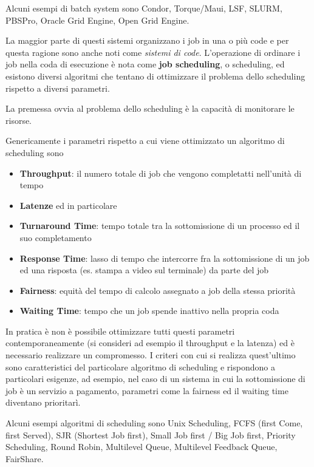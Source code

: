 \documentclass[italian,]{article}
\providecommand{\tightlist}{%
  \setlength{\itemsep}{0pt}\setlength{\parskip}{0pt}}
\begin{document}
Alcuni esempi di batch system sono Condor, Torque/Maui, LSF, SLURM,
PBSPro, Oracle Grid Engine, Open Grid Engine.

La maggior parte di questi sistemi organizzano i job in una o più code e
per questa ragione sono anche noti come \emph{sistemi di code}.
L'operazione di ordinare i job nella coda di esecuzione è nota come
\textbf{job scheduling}, o scheduling, ed esistono diversi algoritmi che
tentano di ottimizzare il problema dello scheduling rispetto a diversi
parametri.

La premessa ovvia al problema dello scheduling è la capacità di
monitorare le risorse.

Genericamente i parametri rispetto a cui viene ottimizzato un algoritmo
di scheduling sono

\begin{itemize}
\tightlist
\item
  \textbf{Throughput}: il numero totale di job che vengono completatti
  nell'unità di tempo
\item
  \textbf{Latenze} ed in particolare
\item
  \textbf{Turnaround Time}: tempo totale tra la sottomissione di un
  processo ed il suo completamento
\item
  \textbf{Response Time}: lasso di tempo che intercorre fra la
  sottomissione di un job ed una risposta (es. stampa a video sul
  terminale) da parte del job
\item
  \textbf{Fairness}: equità del tempo di calcolo assegnato a job della
  stessa priorità
\item
  \textbf{Waiting Time}: tempo che un job spende inattivo nella propria
  coda
\end{itemize}

In pratica è non è possibile ottimizzare tutti questi parametri
contemporaneamente (si consideri ad esempio il throughput e la latenza)
ed è necessario realizzare un compromesso. I criteri con cui si realizza
quest'ultimo sono caratteristici del particolare algoritmo di scheduling
e rispondono a particolari esigenze, ad esempio, nel caso di un sistema
in cui la sottomissione di job è un servizio a pagamento, parametri come
la fairness ed il waiting time diventano prioritarì.

Alcuni esempi algoritmi di scheduling sono Unix Scheduling, FCFS (first
Come, first Served), SJR (Shortest Job first), Small Job first / Big Job
first, Priority Scheduling, Round Robin, Multilevel Queue, Multilevel
Feedback Queue, FairShare.
\end{document}

